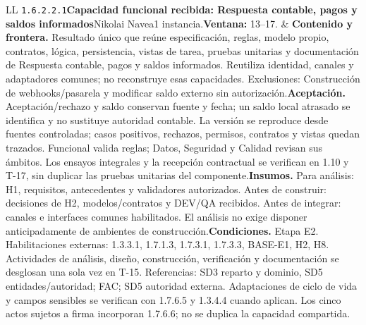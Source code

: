 \begin{longtable}{L{\tabcolsep\relax}L{\tabcolsep\relax}}
\texttt{1.\allowbreak{}6.\allowbreak{}2.\allowbreak{}2.\allowbreak{}1}\newline{}\textbf{Capacidad funcional recibida: Respuesta contable, pagos y saldos informados}\newline{}Nikolai Navea\newline{}1 instancia.\newline{}\textbf{Ventana:} 13--17. & \textbf{Contenido y frontera.} Resultado único que reúne especificación, reglas, modelo propio, contratos, lógica, persistencia, vistas de tarea, pruebas unitarias y documentación de Respuesta contable, pagos y saldos informados. Reutiliza identidad, canales y adaptadores comunes; no reconstruye esas capacidades. Exclusiones: Construcción de webhooks/pasarela y modificar saldo externo sin autorización.\newline{}\textbf{Aceptación.} Aceptación/rechazo y saldo conservan fuente y fecha; un saldo local atrasado se identifica y no sustituye autoridad contable. La versión se reproduce desde fuentes controladas; casos positivos, rechazos, permisos, contratos y vistas quedan trazados. Funcional valida reglas; Datos, Seguridad y Calidad revisan sus ámbitos. Los ensayos integrales y la recepción contractual se verifican en 1.10 y T-17, sin duplicar las pruebas unitarias del componente.\newline{}\textbf{Insumos.} Para análisis: H1, requisitos, antecedentes y validadores autorizados. Antes de construir: decisiones de H2, modelos/contratos y DEV/QA recibidos. Antes de integrar: canales e interfaces comunes habilitados. El análisis no exige disponer anticipadamente de ambientes de construcción.\newline{}\textbf{Condiciones.} Etapa E2. Habilitaciones externas: 1.3.3.1, 1.7.1.3, 1.7.3.1, 1.7.3.3, BASE-E1, H2, H8. Actividades de análisis, diseño, construcción, verificación y documentación se desglosan una sola vez en T-15. Referencias: SD3 reparto y dominio, SD5 entidades/autoridad; FAC; SD5 autoridad externa. Adaptaciones de ciclo de vida y campos sensibles se verifican con 1.7.6.5 y 1.3.4.4 cuando aplican. Los cinco actos sujetos a firma incorporan 1.7.6.6; no se duplica la capacidad compartida.\\\hline

\end{longtable}
